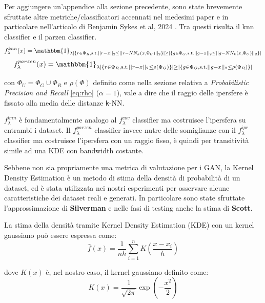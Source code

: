 Per aggiungere un'appendice alla sezione precedente, sono state brevemente sfruttate altre metriche/classificatori accennati nel medesimi paper e in particolare nell'articolo di Benjamin Sykes et al, 2024 \cite{6UnifyingPrecisionRecall}. 
Tra questi risulta il knn classifier e il parzen classifier.
\begin{equation}
    f_{\lambda}^{knn}(x) = \mathbbm{1}_{\lambda |\{ r \in \Phi_R, \text{s.t.} ||r - x||_2 \leq ||r - NN_k(x, \Phi_U)||_2 \}| \geq |\{ g \in \Phi_G, \text{s.t.} ||g - x||_2 \leq ||g - NN_k(x, \Phi_U)||_2 \}|}
\end{equation}
\begin{equation}
    f_{\lambda}^{parzen}(x) = \mathbbm{1}_{\lambda |\{ r \in \Phi_R, \text{s.t.} ||r - x||_2 \leq \rho(\Phi_G) \}| \geq |\{ g \in \Phi_G, \text{s.t.} ||g - x||_2 \leq \rho(\Phi_R) \}|}
\end{equation}

con \(\Phi_U = \Phi_G \cup \Phi_R \) e \(\rho(\Phi)\) definito come nella sezione relativa a \textit{Probabilistic Precision and Recall} \ref{eq:rho} (\(\alpha = 1\)), vale a dire che il raggio delle ipersfere è fissato alla media delle distanze \texttt{k}-NN.

\(f_{\lambda}^{knn}\) è fondamentalmente analogo al \(f_{\lambda}^{cov}\) classifier ma costruisce l'ipersfera su entrambi i dataset.
Il \(f_{\lambda}^{parzen}\) classifier invece nutre delle somiglianze con il \(f_{\lambda}^{ipr}\) classifier ma costruisce l'ipersfera con un raggio fisso, è quindi per transitività simile ad una KDE con bandwidth costante.

Sebbene non sia propriamente una metrica di valutazione per i GAN, la Kernel Density Estimation è un metodo di stima della densità di probabilità di un dataset, ed è stata utilizzata nei nostri esperimenti per osservare alcune caratteristiche dei dataset reali e generati.
In particolare sono state sfruttate l'approssimazione di \textbf{Silverman} e nelle fasi di testing anche la stima di \textbf{Scott}.

La stima della densità tramite Kernel Density Estimation (KDE) con un kernel gaussiano può essere espressa come:
\begin{equation}
    \hat{f}(x) = \frac{1}{n h} \sum_{i=1}^{n} K\left(\frac{x - x_i}{h}\right)
\end{equation}

dove \(K(x)\) è, nel nostro caso, il kernel gaussiano definito come:
\begin{equation}
    K(x) = \frac{1}{\sqrt{2\pi}} \exp\left(-\frac{x^2}{2}\right)
\end{equation}

